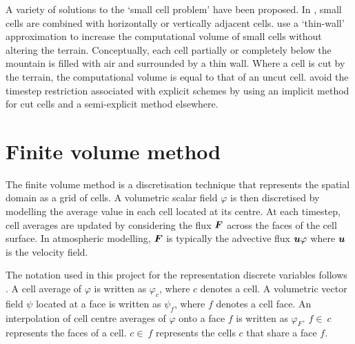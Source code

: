 A variety of solutions to the `small cell problem' have been proposed.  In \textcite{yamazaki-satomura2010}, small cells are combined with horizontally or vertically adjacent cells.  \textcite{steppeler2002} use a `thin-wall' approximation to increase the computational volume of small cells without altering the terrain.  Conceptually, each cell partially or completely below the mountain is filled with air and surrounded by a thin wall.  Where a cell is cut by the terrain, the computational volume is equal to that of an uncut cell.  \textcite{jebens2011} avoid the timestep restriction associated with explicit schemes by using an implicit method for cut cells and a semi-explicit method elsewhere.


\section{Finite volume method}
\label{sec:theory:fv}

The finite volume method is a discretisation technique that represents the spatial domain as a grid of cells.  A volumetric scalar field $\varphi$ is then discretised by modelling the average value in each cell located at its centre.  At each timestep, cell averages are updated by considering the flux $\bm{F}$ across the faces of the cell surface.  In atmospheric modelling, $\bm{F}$ is typically the advective flux $\bm{u} \varphi$ where $\bm{u}$ is the velocity field.

The notation used in this project for the representation discrete variables follows \textcite{weller-shahrokhi2014}.  A cell average of $\varphi$ is written as $\varphi_c$, where $c$ denotes a cell.  A volumetric vector field $\psi$ located at a face is written as $\psi_f$, where $f$ denotes a cell face.  An interpolation of cell centre averages of $\varphi$ onto a face $f$ is written as $\varphi_F$.  $f \in \: c$ represents the faces of a cell.  $c \in \: f$ represents the cells $c$ that share a face $f$.

